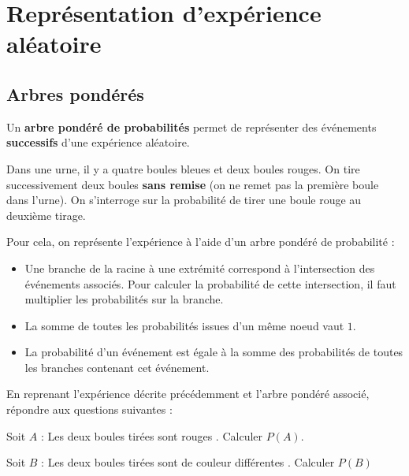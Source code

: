 \documentclass{poly}
\begin{document}
\section{Représentation d'expérience aléatoire}
\subsection{Arbres pondérés}
Un \textbf{arbre pondéré de probabilités} permet de représenter des événements \textbf{successifs} d'une expérience aléatoire. 
\begin{example}
Dans une urne, il y a quatre boules bleues et deux boules rouges. On tire successivement deux boules \textbf{sans remise} (on ne remet pas la première boule dans l'urne). On s'interroge sur la probabilité de tirer une boule rouge au deuxième tirage.

Pour cela, on représente l'expérience à l'aide d'un arbre pondéré de probabilité :
\begin{center}
\end{center}
\end{example}
\begin{proposition}
\hfill
\begin{itemize}
\item Une branche de la racine à une extrémité correspond à l'intersection des événements associés. Pour calculer la probabilité de cette intersection, il faut multiplier les probabilités sur la branche. 
\item La somme de toutes les probabilités issues d'un même noeud vaut $1$.
\item La probabilité d'un événement est égale à la somme des probabilités de toutes les branches contenant cet événement. 
\end{itemize}        
\end{proposition}

\begin{exercize}
En reprenant l'expérience décrite précédemment et l'arbre pondéré associé, répondre aux questions suivantes :
\begin{alphaquestions}
\item Soit $A$ : \og Les deux boules tirées sont rouges \fg. Calculer $P(A)$.
\item Soit $B$ : \og Les deux boules tirées sont de couleur différentes \fg. Calculer $P(B)$
\end{alphaquestions}
\end{exercize}
\end{document}
